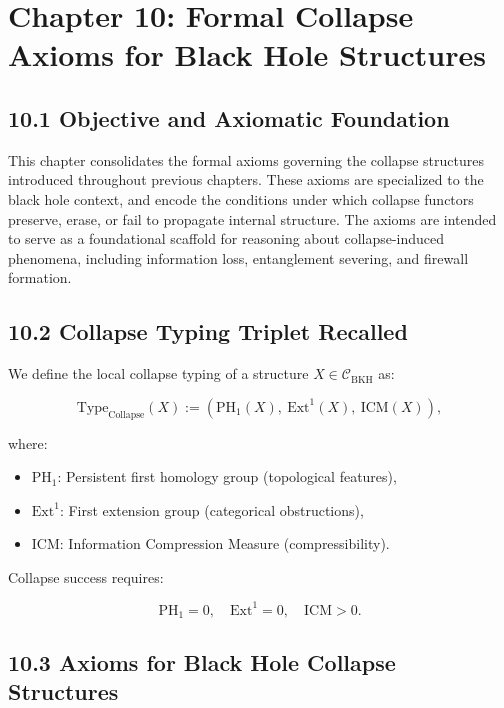 \documentclass[11pt]{article}
\begin{document}
\section{Chapter 10: Formal Collapse Axioms for Black Hole Structures}

\subsection*{10.1 Objective and Axiomatic Foundation}

This chapter consolidates the formal axioms governing the collapse structures introduced throughout previous chapters. These axioms are specialized to the black hole context, and encode the conditions under which collapse functors preserve, erase, or fail to propagate internal structure. The axioms are intended to serve as a foundational scaffold for reasoning about collapse-induced phenomena, including information loss, entanglement severing, and firewall formation.

\subsection*{10.2 Collapse Typing Triplet Recalled}

We define the local collapse typing of a structure \( X \in \mathcal{C}_{\mathrm{BKH}} \) as:

\[
\mathrm{Type}_{\mathrm{Collapse}}(X) := \left( \mathrm{PH}_1(X),\ \mathrm{Ext}^1(X),\ \mathrm{ICM}(X) \right),
\]

where:

\begin{itemize}
    \item \( \mathrm{PH}_1 \): Persistent first homology group (topological features),
    \item \( \mathrm{Ext}^1 \): First extension group (categorical obstructions),
    \item \( \mathrm{ICM} \): Information Compression Measure (compressibility).
\end{itemize}

Collapse success requires:

\[
\mathrm{PH}_1 = 0, \quad \mathrm{Ext}^1 = 0, \quad \mathrm{ICM} > 0.
\]

\subsection*{10.3 Axioms for Black Hole Collapse Structures}
\end{document}
